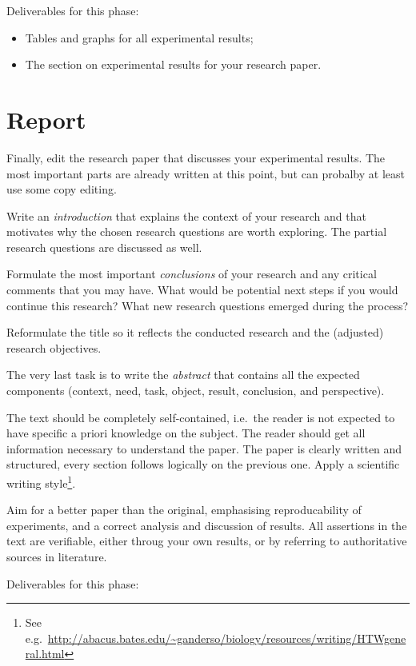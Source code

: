 \documentclass[fleqn,10pt]{artikeltin}
\begin{document}
Deliverables for this phase:

\begin{itemize}
	\item Tables and graphs for all experimental results;
	\item The section on experimental results for your research paper.
\end{itemize}

\section{Report}
\label{sec:report}

Finally, edit the research paper that discusses your experimental results. The most important parts are already written at this point, but can probalby at least use some copy editing.

Write an \emph{introduction} that explains the context of your research and that motivates why the chosen research questions are worth exploring. The partial research questions are discussed as well.

Formulate the most important \emph{conclusions} of your research and any critical comments that you may have. What would be potential next steps if you would continue this research? What new research questions emerged during the process?

Reformulate the title so it reflects the conducted research and the (adjusted) research objectives.

The very last task is to write the \emph{abstract} that contains all the expected components (context, need, task, object, result, conclusion, and perspective).

The text should be completely self-contained, i.e.~the reader is not expected to have specific a priori knowledge on the subject. The reader should get all information necessary to understand the paper. The paper is clearly written and structured, every section follows logically on the previous one. Apply a scientific writing style\footnote{See e.g.~\url{http://abacus.bates.edu/~ganderso/biology/resources/writing/HTWgeneral.html}}.

Aim for a better paper than the original, emphasising reproducability of experiments, and a correct analysis and discussion of results. All assertions in the text are verifiable, either throug your own results, or by referring to authoritative sources in literature.

Deliverables for this phase:
\end{document}
